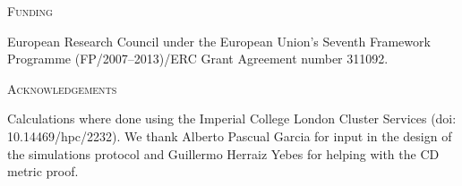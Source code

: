 \documentclass[12pt,letterpaper]{article}
\renewcommand{\section}[1]{%
\bigskip
\begin{center}
\begin{Large}
\normalfont\scshape #1
\medskip
\end{Large}
\end{center}}
\begin{document}
\section{Funding}
European Research Council under the European Union’s Seventh Framework Programme (FP/2007–2013)/ERC Grant Agreement number 311092.

\section{Acknowledgements}
Calculations where done using the Imperial College London Cluster Services (doi: 10.14469/hpc/2232).
We thank Alberto Pascual Garcia for input in the design of the simulations protocol and Guillermo Herraiz Yebes for helping with the CD metric proof.






\end{document}
